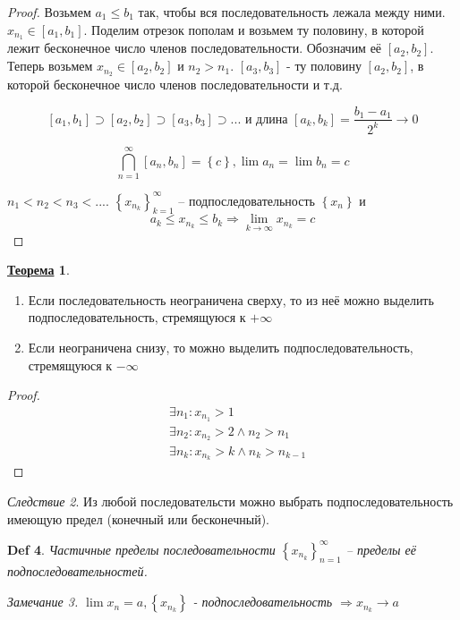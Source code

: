 \documentclass[12pt]{article}
\newenvironment{MyList}[1][4pt]{
  \begin{enumerate}[1.]
  \setlength{\parskip}{0pt}
  \setlength{\itemsep}{#1}
}{       
  \end{enumerate}
}
\def\SO{\Rightarrow}     %
\def\Pagebreak{\pagebreak\vspace*{-1.5em}}
\theoremstyle{definition} %
\newtheorem{Thm}{\underline{Теорема}}[subsection] %
\theoremstyle{plain} %
\newtheorem{Def}[Thm]{Def} %
\theoremstyle{remark} %
\newtheorem{Cons}[Thm]{Следствие} %
\newtheorem{Rem}[Thm]{Замечание} %
\begin{document}
\begin{proof}
    Возьмем $a_1 \leqslant b_1$ так, чтобы вся последовательность лежала между ними. 
    $x_{n_1} \in [a_1, b_1]$. Поделим отрезок пополам и возьмем ту половину, в которой лежит бесконечное число членов последовательности. Обозначим её $[a_2, b_2]$. 
    Теперь возьмем $x_{n_2} \in [a_2, b_2]$ и $n_2 > n_1$. $[a_3, b_3]$ - ту половину $[a_2, b_2]$, в которой бесконечное число членов последовательности и т.д.
    
    \[[a_1, b_1] \supset [a_2, b_2] \supset [a_3, b_3] \supset ... \text{ и длина } [a_k, b_k] = \frac{b_1 - a_1}{2^k} \to 0\]

    \[\bigcap_{n = 1}^\infty [a_n, b_n] = \left\{c\right\}, \lim a_n = \lim b_n = c\]

    $n_1 < n_2 < n_3 < ...$. $\left\{x_{n_k}\right\}_{k = 1}^{\infty}$ -- подпоследовательность $\left\{x_n\right\}$ и $$a_k \leqslant x_{n_k} \leqslant b_k \SO \lim_{k \to \infty} x_{n_k} = c$$    
\end{proof}

\begin{Thm}
    \begin{MyList}
        \item Если последовательность неограничена сверху, то из неё можно выделить подпоследовательность, стремящуюся к $+\infty$ 
        \item Если неограничена снизу, то можно выделить подпоследовательность, стремящуюся к $-\infty$ 
    \end{MyList}
\end{Thm}

\begin{proof}
    \begin{align*}
        &\exists n_1 : x_{n_1} > 1 \\
        &\exists n_2 : x_{n_2} > 2 \wedge n_2 > n_1 \\
        &\exists n_k : x_{n_k} > k \wedge n_k > n_{k - 1}
    \end{align*} 
\end{proof}

\Pagebreak
\begin{Cons}
    Из любой последовательсти можно выбрать подпоследовательность имеющую предел (конечный или бесконечный).
\end{Cons}

\begin{Def}
    Частичные пределы последовательности $\left\{x_{n_k}\right\}_{n = 1}^\infty$ -- пределы её подпоследовательностей.
    
    \begin{Rem}
        $\lim x_n = a, \left\{x_{n_k}\right\}$ - подпоследовательность $\SO x_{n_k} \to a$ 
    \end{Rem}
\end{Def}
\end{document}

